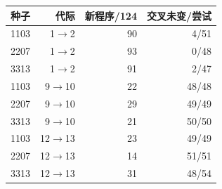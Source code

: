 \begin{tabular}{@{}lrrr@{}}
\toprule
种子 & 代际 & 新程序/124 & 交叉未变/尝试 \\ \midrule
1103 & 1$\to$2 & 90 & 4/51 \\
2207 & 1$\to$2 & 93 & 0/48 \\
3313 & 1$\to$2 & 91 & 2/47 \\
1103 & 9$\to$10 & 22 & 48/48 \\
2207 & 9$\to$10 & 29 & 49/49 \\
3313 & 9$\to$10 & 21 & 50/50 \\
1103 & 12$\to$13 & 23 & 49/49 \\
2207 & 12$\to$13 & 14 & 51/51 \\
3313 & 12$\to$13 & 31 & 48/54 \\
\bottomrule
\end{tabular}
